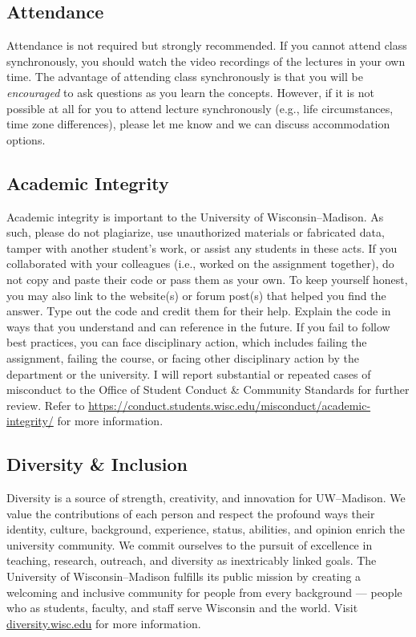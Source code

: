 \documentclass[11pt,]{article}
\begin{document}
\hypertarget{attendance}{%
\subsection{Attendance}\label{attendance}}

Attendance is not required but strongly recommended. If you cannot
attend class synchronously, you should watch the video recordings of the
lectures in your own time. The advantage of attending class
synchronously is that you will be \emph{encouraged} to ask questions as
you learn the concepts. However, if it is not possible at all for you to
attend lecture synchronously (e.g., life circumstances, time zone
differences), please let me know and we can discuss accommodation
options.

\hypertarget{academic-integrity}{%
\subsection{Academic Integrity}\label{academic-integrity}}

Academic integrity is important to the University of Wisconsin--Madison.
As such, please do not plagiarize, use unauthorized materials or
fabricated data, tamper with another student's work, or assist any
students in these acts. If you collaborated with your colleagues (i.e.,
worked on the assignment together), do not copy and paste their code or
pass them as your own. To keep yourself honest, you may also link to the
website(s) or forum post(s) that helped you find the answer. Type out
the code and credit them for their help. Explain the code in ways that
you understand and can reference in the future. If you fail to follow
best practices, you can face disciplinary action, which includes failing
the assignment, failing the course, or facing other disciplinary action
by the department or the university. I will report substantial or
repeated cases of misconduct to the Office of Student Conduct \&
Community Standards for further review. Refer to
\url{https://conduct.students.wisc.edu/misconduct/academic-integrity/}
for more information.

\hypertarget{diversity-inclusion}{%
\subsection{Diversity \& Inclusion}\label{diversity-inclusion}}

Diversity is a source of strength, creativity, and innovation for
UW--Madison. We value the contributions of each person and respect the
profound ways their identity, culture, background, experience, status,
abilities, and opinion enrich the university community. We commit
ourselves to the pursuit of excellence in teaching, research, outreach,
and diversity as inextricably linked goals. The University of
Wisconsin--Madison fulfills its public mission by creating a welcoming
and inclusive community for people from every background --- people who
as students, faculty, and staff serve Wisconsin and the world. Visit
\href{https://diversity.wisc.edu/}{diversity.wisc.edu} for more
information.
\end{document}
